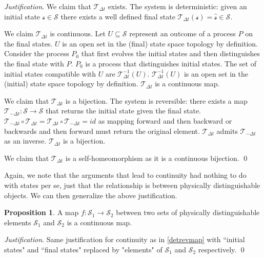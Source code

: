 \documentclass[aps,pra,10pt,twocolumn,floatfix,nofootinbib]{revtex4-1}
\numberwithin{equation}{section}
\theoremstyle{definition}
\newtheorem{prop}[equation]{Proposition}
\newenvironment{justification}{\emph{Justification}.}{\qed}
\begin{document}
\begin{justification}
We claim that $\mathcal{T}_{\Delta t}$ exists. The system is deterministic: given an initial state $\mathcal{s} \in \mathcal{S}$ there exists a well defined final state $\mathcal{T}_{\Delta t}(\mathcal{s})=\hat{\mathcal{s}} \in \mathcal{S}$.

We claim $\mathcal{T}_{\Delta t}$ is continuous. Let $U \subseteq \mathcal{S}$ represent an outcome of a process $P$ on the final states. $U$ is an open set in the (final) state space topology by definition. Consider the process $P_0$ that first evolves the initial states and then distinguishes the final state with $P$. $P_0$ is a process that distinguishes initial states. The set of initial states compatible with $U$ are $\mathcal{T}_{\Delta t}^{-1}(U)$. $\mathcal{T}_{\Delta t}^{-1}(U)$ is an open set in the (initial) state space topology by definition. $\mathcal{T}_{\Delta t}$ is a continuous map.

We claim that $\mathcal{T}_{\Delta t}$ is a bijection. The system is reversible: there exists a map $\mathcal{T}_{-\Delta t}:\mathcal{S} \rightarrow \mathcal{S}$ that returns the initial state given the final state. $\mathcal{T}_{-\Delta t} \circ \mathcal{T}_{\Delta t} = \mathcal{T}_{\Delta t} \circ \mathcal{T}_{-\Delta t} = id$ as mapping forward and then backward or backwards and then forward must return the original element. $\mathcal{T}_{\Delta t}$ admits $\mathcal{T}_{-\Delta t}$ as an inverse. $\mathcal{T}_{\Delta t}$ is a bijection.

We claim that $\mathcal{T}_{\Delta t}$ is a self-homeomorphism as it is a continuous bijection.
\end{justification}

Again, we note that the arguments that lead to continuity had nothing to do with states per se, just that the relationship is between physically distinguishable objects. We can then generalize the above justification.

\begin{prop}\label{continuous_map}
	A map $f:\mathcal{S_1} \rightarrow \mathcal{S_2}$ between two sets of physically distinguishable elements $\mathcal{S_1}$ and $\mathcal{S_2}$ is a continuous map.
\end{prop}

\begin{justification}
	Same justification for continuity as in \ref{detrevmap} with ``initial states" and ``final states" replaced by "elements" of $\mathcal{S_1}$ and $\mathcal{S_2}$ respectively.
\end{justification}
\end{document}
